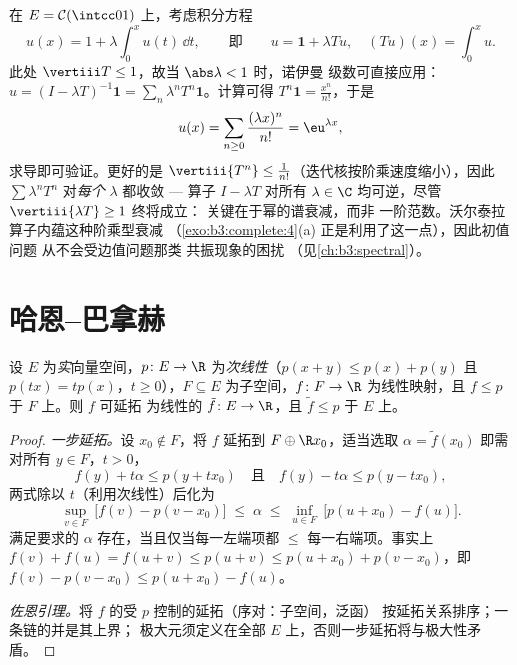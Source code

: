 \begin{example}
\label{ex:b3:banach:volterraexample}
在 $E = \mathcal C(\intcc01)$ 上，考虑积分方程
\[
u(x) = 1 + \lambda\int_0^xu(t)\,\dd t,
\qquad\text{即}\qquad u = \mathbf 1 + \lambda Tu,
\quad (Tu)(x) = \int_0^xu .
\]
此处 $\vertiii T \leq 1$，故当 $\abs\lambda < 1$ 时，诺伊曼
级数可直接应用：$u = (I - \lambda T)^{-1}\mathbf 1 =
\sum_n\lambda^nT^n\mathbf 1$。计算可得 $T^n\mathbf 1 =
\frac{x^n}{n!}$，于是
\[
u(x) = \sum_{n\geq0}\frac{(\lambda x)^n}{n!} =
\eu^{\lambda x} ,
\]
求导即可验证。更好的是 $\vertiii{T^n} \leq
\frac1{n!}$（迭代核按阶乘速度缩小），因此
$\sum\lambda^nT^n$ 对\emph{每个} $\lambda$ 都收敛 ---
算子 $I - \lambda T$ 对所有 $\lambda
\in \C$ 均可逆，尽管 $\vertiii{\lambda T} \geq 1$ 终将成立：
关键在于幂的谱衰减，而非
一阶范数。沃尔泰拉算子内蕴这种阶乘型衰减
（\cref{exo:b3:complete:4}(a) 正是利用了这一点），因此初值问题
从不会受边值问题那类
共振现象的困扰
（见\cref{ch:b3:spectral}）。
\end{example}

\section{哈恩--巴拿赫}

\begin{theorem}
\label{thm:b3:banach:hahnbanach}
设 $E$ 为\emph{实}向量空间，$p \colon E \to \R$
为\emph{次线性}（$p(x + y) \leq p(x) + p(y)$ 且 $p(tx) =
tp(x)$，$t \geq 0$），$F \subseteq E$ 为子空间，$f
\colon F \to \R$ 为线性映射，且 $f \leq p$ 于 $F$ 上。则 $f$ 可延拓
为线性的 $\tilde f \colon E \to \R$，且 $\tilde f \leq p$
于 $E$ 上。
\end{theorem}

\begin{proof}
\emph{一步延拓。}设 $x_0 \notin F$，将 $f$ 延拓到
$F \oplus \R x_0$，适当选取 $\alpha = \tilde f(x_0)$
即需对所有 $y \in F$，$t > 0$，
\[
f(y) + t\alpha \leq p(y + tx_0)
\quad\text{且}\quad
f(y) - t\alpha \leq p(y - tx_0),
\]
两式除以 $t$（利用次线性）后化为
\[
\sup_{v \in F}\ \bigl[f(v) - p(v - x_0)\bigr]
\;\leq\; \alpha \;\leq\;
\inf_{u \in F}\ \bigl[p(u + x_0) - f(u)\bigr].
\]
满足要求的 $\alpha$ 存在，当且仅当每一左端项都 $\leq$
每一右端项。事实上 $f(v) + f(u) = f(u + v) \leq p(u + v) \leq
p(u + x_0) + p(v - x_0)$，即 $f(v) - p(v - x_0) \leq p(u +
x_0) - f(u)$。

\emph{佐恩引理。}将 $f$ 的受 $p$ 控制的延拓（序对：子空间，泛函）
按延拓关系排序；一条链的并是其上界；
极大元须定义在全部
$E$ 上，否则一步延拓将与极大性矛盾。
\end{proof}

